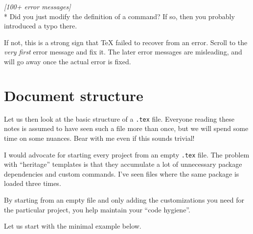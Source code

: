 \medskip\noindent\emph{[100+ error messages]}\\*
Did you just modify the definition of a command?
If so, then you probably introduced a typo there.

If not, this is a strong sign that \TeX{} failed to recover from an error.
Scroll to the \emph{very first} error message and fix it.
The later error messages are misleading,
and will go away once the actual error is fixed.




%
%
%
\section{Document structure}\label{sec:document structure}

Let us then look at the basic structure of a \verb|.tex| file.
Everyone reading these notes is assumed to have seen such a file more than once,
but we will spend some time on some nuances.
Bear with me even if this sounds trivial!

\begin{practices}
I would advocate for starting every project from an empty \verb|.tex| file.
The problem with ``heritage'' templates is that they accumulate a lot
of unnecessary package dependencies and custom commands.
I've seen files where the same package is loaded three times.

By starting from an empty file
and only adding the customizations you need for the particular project,
you help maintain your ``code hygiene''.
\end{practices}

Let us start with the minimal example below.


